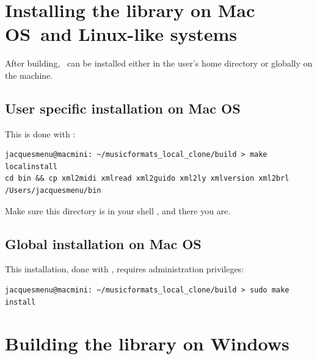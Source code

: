 \section{Installing the library on Mac OS\texttrademark\ and Linux-like systems}

After building, \mf\ can be installed either in the user's home directory or globally on the machine.


\subsection{User specific installation on Mac OS\texttrademark}

This is done with :
\begin{lstlisting}[language=Terminal]
jacquesmenu@macmini: ~/musicformats_local_clone/build > make localinstall
cd bin && cp xml2midi xmlread xml2guido xml2ly xmlversion xml2brl /Users/jacquesmenu/bin
\end{lstlisting}

Make sure this  directory is in your shell , and there you are.


\subsection{Global installation on Mac OS\texttrademark}

This installation, done with , requires administration privileges:
\begin{lstlisting}[language=Terminal]
jacquesmenu@macmini: ~/musicformats_local_clone/build > sudo make install
\end{lstlisting}


\section{Building the library on Windows\texttrademark}

